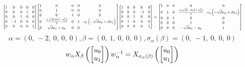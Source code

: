 \documentclass[11pt]{article}
\theoremstyle{definition}
\begin{document}
\[
\scaletoalign{\textwidth}{{\left[\begin{matrix}1 & 0 & 0 & 0 & 0\\0 & 0 & 0 & 1 & 0\\0 & 0 & 1 & 0 & 0\\0 & -1 & 0 & 0 & 0\\0 & 0 & 0 & 0 & 1\end{matrix}\right]} {\left[\begin{matrix}1 & 0 & 0 & 0 & 0\\0 & 1 & 0 & 0 & 0\\0 & 0 & 1 & 0 & 0\\0 & \frac{c_{0} \sqrt{d} \left(d u_{1}^{2} - u_{0}^{2}\right)}{2} & 0 & 1 & c_{0} \left(- \sqrt{d} u_{0} + d u_{1}\right)\\0 & \sqrt{d} u_{1} + u_{0} & 0 & 0 & 1\end{matrix}\right]} {\left[\begin{matrix}1 & 0 & 0 & 0 & 0\\0 & 0 & 0 & -1 & 0\\0 & 0 & 1 & 0 & 0\\0 & 1 & 0 & 0 & 0\\0 & 0 & 0 & 0 & 1\end{matrix}\right]} = {\left[\begin{matrix}1 & 0 & 0 & 0 & 0\\0 & 1 & 0 & \frac{c_{0} \sqrt{d} \left(- d u_{1}^{2} + u_{0}^{2}\right)}{2} & c_{0} \left(- \sqrt{d} u_{0} + d u_{1}\right)\\0 & 0 & 1 & 0 & 0\\0 & 0 & 0 & 1 & 0\\0 & 0 & 0 & - \sqrt{d} u_{1} - u_{0} & 1\end{matrix}\right]}}
\]
\[
\alpha = \left( 0, \  -2, \  0, \  0, \  0\right), \beta = \left( 0, \  1, \  0, \  0, \  0\right), \sigma_{\alpha}(\beta) = \left( 0, \  -1, \  0, \  0, \  0\right)
\]
\[
\scaletoalign{\textwidth}{w_{\alpha} X_{\beta}\left(\left[\begin{matrix}u_{0}\\u_{1}\end{matrix}\right]\right) w_{\alpha}^{-1} = X_{\sigma_{\alpha}\left(\beta\right)}\left(\left[\begin{matrix}u_{0}\\u_{1}\end{matrix}\right]\right)}
\]
\end{document}
